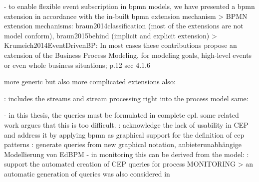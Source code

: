 



- to enable flexible event subscription in bpmn models, we have presented a bpmn extension in accordance with the in-built bpmn extension mechanism
> BPMN extension mechanisms: braun2014classification (most of the extensions are not model conform), braun2015behind (implicit and explicit extension)
> Krumeich2014EventDrivenBP: In most cases these contributions propose an extension of the Business Process Modeling, for modeling goals, high-level events or even whole business situations; p.12 sec 4.1.6


more generic but also more complicated extensions
also: \cite{juric2010wsdl}


\cite{appel2014modeling}: includes the streams and stream processing right into the process model
same: \cite{biornstad2006control}


- in this thesis, the queries must be formulated in complete epl. some related work argues that this is too difficult.
\cite{Kunz2010}: acknowledge the lack of usability in CEP and address it by applying bpmn as graphical support for the definition of cep patterns
\cite{gabriel2016konzeptionelle}: generate queries from new graphical notation, anbieterunabhängige Modellierung von EdBPM
- in monitoring this can be derived from the model:
\cite{backmann2013model}: support the automated creation of CEP queries for process MONITORING 
> an automatic generation of queries was also considered in  \cite{Pufahl2017}

